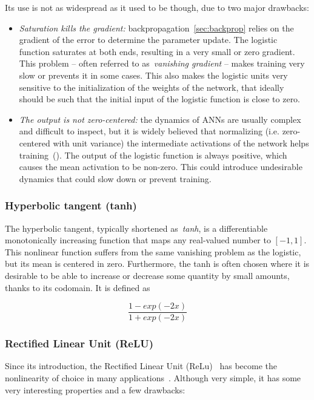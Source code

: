 Its use is not as widespread as it used to be though, due to two major
drawbacks:
\begin{itemize}
    \item \emph{Saturation kills the gradient:}
        backpropagation~\autoref{sec:backprop} relies on the gradient of the
        error to determine the parameter update. The logistic function
        saturates at both ends, resulting in a very small or zero gradient.
        This problem -- often referred to as~\emph{vanishing gradient} -- makes
        training very slow or prevents it in some cases. This also makes the
        logistic units very sensitive to the initialization of the weights of
        the network, that ideally should be such that the initial input of the
        logistic function is close to zero.
    \item \emph{The output is not zero-centered:} the dynamics of ANNs are
        usually complex and difficult to inspect, but it is widely believed
        that normalizing (i.e. zero-centered with unit variance) the
        intermediate activations of the network helps
        training~(\cite{Ioffe+Szegedy-2015,Laurent2015,arpit2016normalization,
        cooijmans2016recurrent}). The output of the logistic function is always
        positive, which causes the mean activation to be non-zero. This could
        introduce undesirable dynamics that could slow down or prevent
        training.
\end{itemize}

\subsubsection{Hyperbolic tangent (tanh)}\label{sec:tanh}

The hyperbolic tangent, typically shortened as~\emph{tanh}, is a differentiable
monotonically increasing function that maps any real-valued number to $[-1, 1]$.
This nonlinear function suffers from the same vanishing problem as the
logistic, but its mean is centered in zero. Furthermore, the tanh is often
chosen where it is desirable to be able to increase or decrease some quantity
by small amounts, thanks to its codomain. It is defined as

\begin{equation}\label{eq:fn_composition}
    \frac{1-exp(-2x)}{1+exp(-2x)}
\end{equation}


\subsubsection{Rectified Linear Unit (ReLU)}\label{sec:ReLU}
Since its introduction, the Rectified Linear Unit
(ReLu)~\cite{Jarrett-ICCV2009-small,Nair+Hinton-2010} has become the
nonlinearity of choice in many
applications~\cite{Krizhevsky-2012,LeCun-et-al-Nature2015,
Gloroto+Bengio-2010anon}. Although very simple, it has some very interesting
properties and a few drawbacks:

